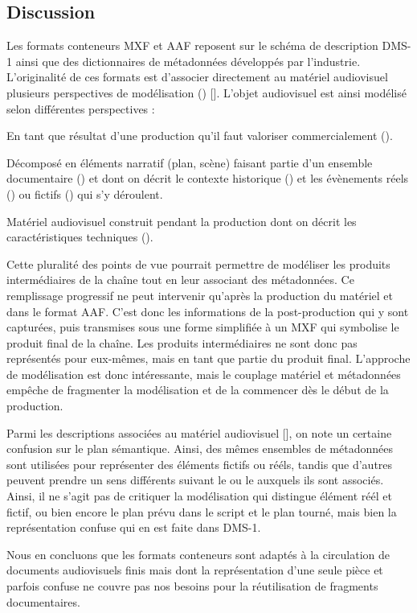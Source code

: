 \subsection*{Discussion}
Les formats conteneurs MXF et AAF reposent sur le schéma de description DMS-1 ainsi que des dictionnaires de métadonnées développés par l'industrie.
L'originalité de ces formats est d'associer directement au matériel audiovisuel plusieurs perspectives de modélisation () [].
L'objet audiovisuel est ainsi modélisé selon différentes perspectives :
\begin{liste} 
	\item En tant que résultat d'une production qu'il faut valoriser commercialement ().
	\item Décomposé en éléments narratif (plan, scène) faisant partie d'un ensemble documentaire () et dont on décrit le contexte historique () et les évènements réels () ou fictifs () qui s'y déroulent.
	\item Matériel audiovisuel construit pendant la production dont on décrit les caractéristiques techniques ().
\end{liste}
Cette pluralité des points de vue pourrait permettre de modéliser les produits intermédiaires de la chaîne tout en leur associant des métadonnées. 
Ce remplissage progressif ne peut intervenir qu'après la production du matériel et dans le format AAF. 
C'est donc les informations de la post-production qui y sont capturées, puis transmises sous une forme simplifiée à un MXF qui symbolise le produit final de la chaîne.
Les produits intermédiaires ne sont donc pas représentés pour eux-mêmes, mais en tant que partie du produit final.
L'approche de modélisation est donc intéressante, mais le couplage matériel et métadonnées empêche de fragmenter la modélisation et de la commencer dès le début de la production.

Parmi les descriptions associées au matériel audiovisuel [], on note un certaine confusion sur le plan sémantique. 
Ainsi, des mêmes ensembles de métadonnées sont utilisées pour représenter des éléments fictifs ou rééls, tandis que d'autres peuvent prendre un sens différents suivant le  ou le  auxquels ils sont associés.
Ainsi, il ne s'agit pas de critiquer la modélisation qui distingue élément réél et fictif, ou bien encore le plan prévu dans le script et le plan tourné, mais bien la représentation confuse qui en est faite dans DMS-1.

Nous en concluons que les formats conteneurs sont adaptés à la circulation de documents audiovisuels finis mais dont la représentation d'une seule pièce et parfois confuse ne couvre pas nos besoins pour la réutilisation de fragments documentaires.
